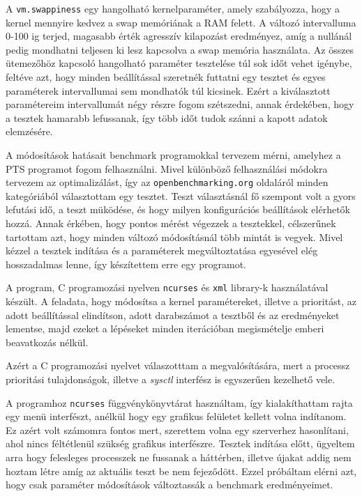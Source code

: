 A \texttt{vm.swappiness} egy hangolható kernelparaméter, amely szabályozza, hogy a kernel mennyire kedvez a swap memóriának a RAM felett. A változó intervalluma 0-100 ig terjed, magasabb érték agresszív kilapozást eredményez, amíg a nullánál pedig mondhatni teljesen ki lesz kapcsolva a swap memória használata. Az összes ütemezőhöz kapcsoló hangolható paraméter tesztelése túl sok időt vehet igénybe, feltéve azt, hogy minden beállítással szeretnék futtatni egy tesztet és egyes paraméterek intervallumai sem mondhatók túl kicsinek. Ezért a kiválasztott paramétereim intervallumát négy részre fogom szétszedni, annak érdekében, hogy a tesztek hamarabb lefussanak, így több időt tudok szánni a kapott adatok elemzésére.

A módosítások hatásait benchmark programokkal tervezem mérni, amelyhez a PTS programot fogom felhasználni. Mivel különböző felhasználási módokra tervezem az optimalizálást, így az \texttt{openbenchmarking.org} oldaláról minden kategóriából választottam egy tesztet. 
Teszt választásnál fő szempont volt a gyors lefutási idő, a teszt müködése, és hogy milyen konfigurációs beállítások elérhetők hozzá. Annak érkében, hogy pontos mérést végezzek a tesztekkel, célszerűnek tartottam azt, hogy minden változó módosításnál több mintát is vegyek.
Mivel kézzel a tesztek indítása és a paraméterek megváltoztatása egyesével elég hosszadalmas lenne, így készítettem erre egy programot.


A program, C programozási nyelven \texttt{ncurses} és \texttt{xml} library-k használatával készült.
A feladata, hogy módosítsa a kernel paramétereket, illetve a prioritást, az adott beállítással elindítson, adott darabszámot a tesztből és az eredményeket lementse, majd ezeket a lépéseket minden iterációban megismételje emberi beavatkozás nélkül.

Azért a C programozási nyelvet válaszotttam a megvalósítására, mert a processz prioritási tulajdonságok, illetve a \textit{sysctl} interfész is egyszerűen kezelhető vele.

A programhoz \texttt{ncurses} függvénykönyvtárat használtam, így kialakíthattam rajta egy menü interfészt, anélkül hogy egy grafikus felületet kellett volna indítanom. Ez azért volt számomra fontos mert, szerettem volna egy szerverhez hasonlítani, ahol nincs féltétlenül szükség grafikus interfészre. Tesztek indítása előtt, ügyeltem arra hogy felesleges processzek ne fussanak a háttérben, illetve újakat addig nem hoztam létre amíg az aktuális teszt be nem fejeződött. Ezzel próbáltam elérni azt, hogy csak paraméter módosítások változtassák a benchmark eredményeimet.


